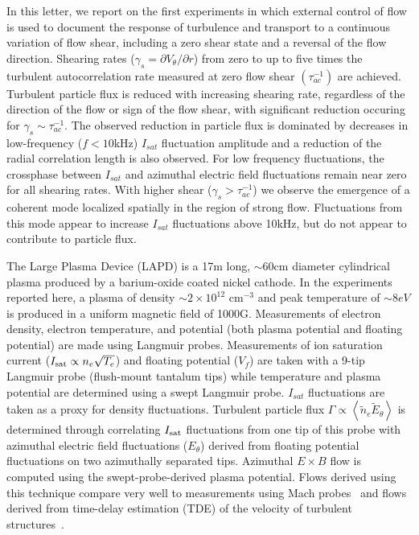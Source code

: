 \documentclass[aps,prl,amsmath,amssymb,preprint,superscriptaddress]{revtex4}
\begin{document}
In this letter, we report on the first experiments in which external control of flow is used to document the response of turbulence and transport to a continuous variation of flow shear, including a zero shear state and a reversal of the flow direction. Shearing rates ($\gamma_{s}= \partial V_{\theta}/\partial r$) from
zero to up to five times the turbulent autocorrelation rate measured at zero flow shear $(\tau_{ac}^{-1})$ are achieved. Turbulent particle flux is reduced with increasing shearing rate, regardless of the direction of the flow or sign of the flow shear, with significant reduction occuring for $\gamma_{s} \sim \tau_{ac}^{-1}$.  The observed reduction in particle flux is dominated by decreases in low-frequency ($f < 10$kHz) $I_{sat}$ fluctuation amplitude and a reduction of the radial correlation length is also observed. For low frequency fluctuations, the crossphase between $I_{sat}$ and azimuthal electric field fluctuations remain near zero for all shearing rates.  With higher shear ($\gamma_{s} > \tau_{ac}^{-1}$) we observe the emergence of a coherent mode localized spatially in the region
of strong flow. Fluctuations from this mode appear to increase $I_{sat}$ fluctuations above 10kHz, but do not appear to contribute to particle flux.   

The Large Plasma Device \cite{gek91} (LAPD) is a 17m long, $\sim 60$cm
diameter cylindrical plasma produced by a barium-oxide coated nickel
cathode. In the experiments reported here, a plasma of density $\sim 2
\times 10^{12}$ cm$^{-3}$ and peak temperature of $\sim 8 eV$ is
produced in a uniform magnetic field of 1000G.  Measurements of 
electron density, electron temperature, and potential (both plasma
potential and floating potential) are made using Langmuir probes.  
Measurements of ion saturation current ($I_{\rm sat} \propto n_e \sqrt{T_e}$) and floating
potential ($V_f$) are taken with a 9-tip Langmuir probe (flush-mount
tantalum tips) while temperature and plasma potential are
determined using a swept Langmuir probe. $I_{sat}$ fluctuations are taken as a proxy for density fluctuations. Turbulent particle flux
$\Gamma \propto \left<\tilde{n}_e \tilde{E}_\theta\right>$ is
determined through correlating $I_{\rm sat}$ fluctuations from one tip
of this probe with
azimuthal electric field fluctuations ($E_\theta$) derived from
floating potential fluctuations on two azimuthally separated tips.
Azimuthal $E\times B$ flow is computed
using the swept-probe-derived plasma potential.  Flows derived using
this technique compare very well to measurements using
Mach probes~\cite{maggs07} and flows derived from time-delay
estimation (TDE) of the velocity of turbulent structures~\cite{holland04}.
  
\end{document}
